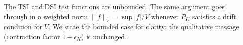 \begin{remark}[Unbounded $g$]
The TSI and DSI test functions are unbounded. The same argument goes through in a weighted norm $\|f\|_V=\sup|f|/V$ whenever $P_K$ satisfies a drift condition for $V$. We state the bounded case for clarity: the qualitative message (contraction factor $1-\epsilon_K$) is unchanged.
\end{remark}
